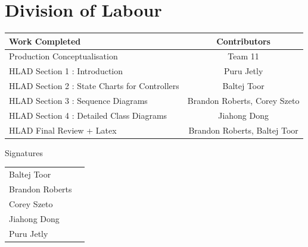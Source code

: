 \documentclass[]{article}
\begin{document}
\newpage
\section{Division of Labour}
\label{sec:division_of_labour}
\begin{center}
\large
			\begin{tabular}{l|c}
				Work Completed   & Contributors \\\hline
				Production Conceptualisation &Team 11 \\
				HLAD Section 1 : Introduction & Puru Jetly \\
				HLAD Section 2 : State Charts for Controllers  & Baltej Toor \\
				HLAD Section 3 : Sequence Diagrams  & Brandon Roberts, Corey Szeto \\
				HLAD Section 4 : Detailed Class Diagrams & Jiahong Dong \\
				HLAD Final Review + Latex  & Brandon Roberts, Baltej Toor \\
			\end{tabular}
			\vspace{0.1in}
\huge Signatures
\end{center}
			\vspace{0.3in}
\large
			\begin{tabular}{l|r}
			\vspace{1in}
				Baltej Toor  & \underline{\hspace{8cm}} \\
			\vspace{1in}
				Brandon Roberts   & \underline{\hspace{8cm}} \\
			\vspace{1in}
				Corey Szeto  & \underline{\hspace{8cm}} \\
			\vspace{1in}
				Jiahong Dong   & \underline{\hspace{8cm}} \\
			\vspace{1in}
				Puru Jetly   & \underline{\hspace{8cm}} \\
			\end{tabular}
\end{document}

